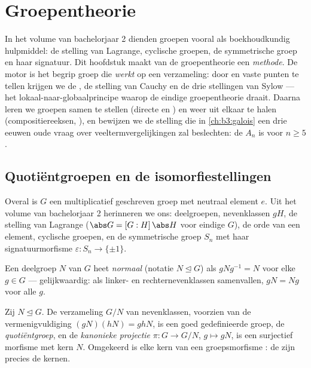 \chapter{Groepentheorie}\label{ch:b3:groups}

In het volume van bachelorjaar 2 dienden groepen vooral als
boekhoudkundig hulpmiddel: de stelling van Lagrange, cyclische
groepen, de symmetrische groep en haar signatuur. Dit hoofdstuk
maakt van de groepentheorie een \emph{methode}. De motor is het
begrip groep die \emph{werkt} op een verzameling: door  en
vaste punten te tellen krijgen we de , de
stelling van Cauchy en de drie stellingen van Sylow --- het
lokaal-naar-globaalprincipe waarop de eindige groepentheorie
draait. Daarna leren we groepen samen te stellen (directe en
) en weer uit elkaar te halen
(compositiereeksen, ), en bewijzen we de stelling
die in \cref{ch:b3:galois} een drie eeuwen oude vraag over
veeltermvergelijkingen zal beslechten: de  $A_n$
is  voor $n \geq 5$.

\section{Quotiëntgroepen en de isomorfiestellingen}

Overal is $G$ een multiplicatief geschreven groep met neutraal
element $e$. Uit het volume van bachelorjaar 2 herinneren we ons:
deelgroepen, nevenklassen $gH$, de stelling van Lagrange ($\abs G =
[G:H]\,\abs H$ voor eindige $G$), de orde van een element, cyclische
groepen, en de symmetrische groep $S_n$ met haar
signatuurmorfisme $\varepsilon \colon S_n \to \{\pm1\}$.

\begin{definition}\label{def:b3:groups:normal}
Een deelgroep $N$ van $G$ heet \emph{normaal}
(notatie $N \trianglelefteq G$) als $gNg^{-1} = N$ voor elke $g
\in G$ --- gelijkwaardig: als linker- en rechternevenklassen
samenvallen, $gN = Ng$ voor alle $g$.
\end{definition}

\begin{theorem}[Quotiëntgroep]\label{thm:b3:groups:quotient}
Zij $N \trianglelefteq G$. De verzameling $G/N$ van nevenklassen,
voorzien van de vermenigvuldiging $(gN)(hN) = ghN$, is een goed
gedefinieerde groep, de \emph{quotiëntgroep},
en de \emph{kanonieke projectie} $\pi \colon G \to G/N$, $g \mapsto
gN$, is een surjectief morfisme met kern $N$. Omgekeerd is elke
kern van een groepsmorfisme : de  zijn precies
de kernen.
\end{theorem}

